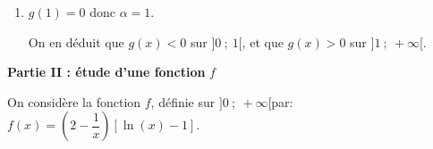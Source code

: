 \documentclass[10pt]{article}
\begin{document}
\begin{enumerate}
D'après ce tableau de variations, on peut dire que l'équation $g(x) = 0$ admet une unique solution $\alpha$ sur $]0~;~ +\infty[$. 

\item $g(1)=0$ donc $\alpha=1$.

On en déduit que $g(x)<0$ sur $]0~;~1[$, et que $g(x) >0$ sur $]1~;~+\infty[$.

\end{enumerate}

\bigskip

\textbf{Partie II : étude d'une fonction } \boldmath $f$\unboldmath

\medskip

On considère la fonction $f$, définie sur $]0~;~ +\infty[$par: $f(x) = \left(2 - \dfrac{1}{x}\right)[\ln (x) - 1]$.
\end{document}
